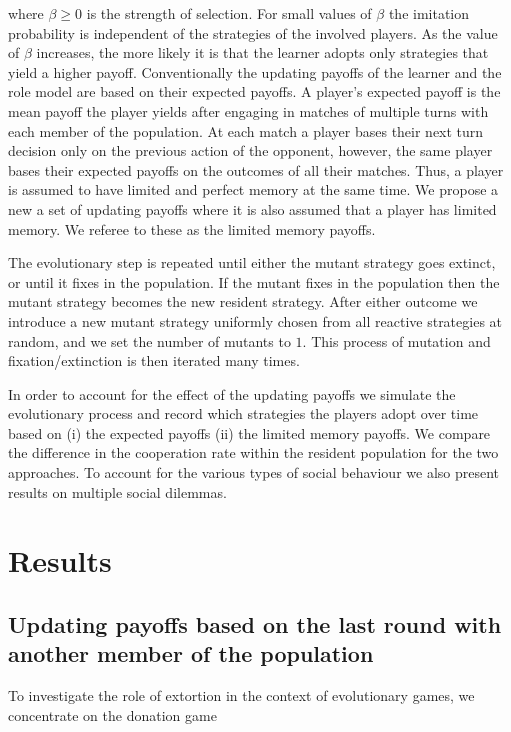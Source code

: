 \documentclass[11pt]{article}
\theoremstyle{plainCl1}
\theoremstyle{plainCl2}
\begin{document}
where $\beta\!\ge\!0$ is the strength of selection. For small values of $\beta$
the imitation probability is independent of the strategies of the involved
players. As the value of $\beta$ increases, the more likely it is that the
learner adopts only strategies that yield a higher payoff. Conventionally the
updating payoffs of the learner and the role model are based on their expected
payoffs. A player's expected payoff is the mean payoff the player yields after
engaging in matches of multiple turns with each member of the population. At
each match a player bases their next turn decision only on the previous action
of the opponent, however, the same player bases their expected payoffs on the
outcomes of all their matches. Thus, a player is assumed to have limited and
perfect memory at the same time. We propose a new a set of updating payoffs
where it is also assumed that a player has limited memory. We referee to these
as the limited memory payoffs.

The evolutionary step is repeated until either the mutant strategy goes extinct,
or until it fixes in the population. If the mutant fixes in the population then
the mutant strategy becomes the new resident strategy. After either outcome we
introduce a new mutant strategy uniformly chosen from all reactive strategies at
random, and we set the number of mutants to $1$. This process of mutation and
fixation/extinction is then iterated many times.

In order to account for the effect of the updating payoffs we simulate the
evolutionary process and record which strategies the players adopt over time
based on (i) the expected payoffs (ii) the limited memory payoffs. We compare
the difference in the cooperation rate within the resident population for the
two approaches. To account for the various types of social behaviour we also
present results on multiple social dilemmas.


\section{Results}\label{section:results} \subsection{Updating payoffs based on
the last round with another member of the population}\label{section:donation}

To investigate the role of extortion in the context of evolutionary games, we
concentrate on the donation game 
\end{document}
